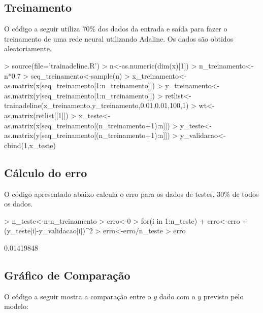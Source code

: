 \documentclass{article}
\begin{document}
\subsection{Treinamento}

O código a seguir utiliza 70\% dos dados da entrada e saída para fazer o treinamento de uma rede neural utilizando Adaline. Os dados são obtidos aleatoriamente.

\begin{Schunk}
\begin{Sinput}
>   source(file='trainadeline.R')
>   n<-as.numeric(dim(x)[1])
>   n_treinamento<-n*0.7
>   seq_treinamento<-sample(n)
>   x_treinamento<-as.matrix(x[seq_treinamento[1:n_treinamento]])
>   y_treinamento<-as.matrix(y[seq_treinamento[1:n_treinamento]])
>   retlist<-trainadeline(x_treinamento,y_treinamento,0.01,0.01,100,1)
>   wt<-as.matrix(retlist[[1]])
>   x_teste<-as.matrix(x[seq_treinamento[(n_treinamento+1):n]])
>   y_teste<-as.matrix(y[seq_treinamento[(n_treinamento+1):n]])
>   y_validacao<-cbind(1,x_teste) %
\end{Sinput}
\end{Schunk}

\subsection{Cálculo do erro}

O código apresentado abaixo calcula o erro para os dados de testes, 30\% de todos os dados.

\begin{Schunk}
\begin{Sinput}
>   n_teste<-n-n_treinamento
>   erro<-0
>   for(i in 1:n_teste)
+     erro<-erro + (y_teste[i]-y_validacao[i])^2
>   erro<-erro/n_teste
>   erro  
\end{Sinput}
\begin{Soutput}
[1] 0.01419848
\end{Soutput}
\end{Schunk}

\subsection{Gráfico de Comparação}

O código a seguir mostra a comparação entre o $y$ dado com o $y$ previsto pelo modelo:
\end{document}
